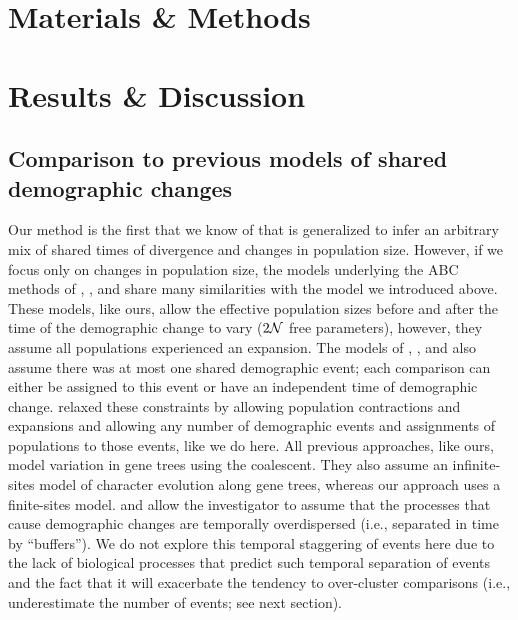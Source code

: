 

\section{Materials \& Methods}




\section{Results \& Discussion}



\subsection{Comparison to previous models of shared demographic changes}

Our method is the first that we know of that is generalized to infer an
arbitrary mix of shared times of divergence and changes in population size.
However, if we focus only on changes in population size, the models underlying
the ABC methods of
\citet{Chan2014}, \citet{Xue2015}, and \citet{Gehara2017}
share many similarities with the model we introduced above.
These models, like ours, allow the effective population sizes before and after
the time of the demographic change to vary ($2\mathcal{N}$ free parameters),
however, they assume all populations experienced an expansion.
The models of \citet{Chan2014}, \citet{Xue2015}, and \citet{Gehara2017}
also assume there was at most one shared demographic event;
each comparison can either be assigned to this event or have an independent
time of demographic change.
\citet{Xue2017} relaxed these constraints by allowing population contractions
and expansions and allowing any number of demographic events and assignments of
populations to those events, like we do here.
All previous approaches, like ours, model variation in gene trees using the
coalescent.
They also assume an infinite-sites model of character evolution along gene
trees, whereas our approach uses a finite-sites model.
\citet{Gehara2017} and \citet{Xue2017}
allow the investigator to assume that the processes that cause demographic
changes are temporally overdispersed (i.e., separated in time by ``buffers'').
We do not explore this temporal staggering of events here due to the lack of
biological processes that predict such temporal separation of events and the
fact that it will exacerbate the tendency to over-cluster comparisons
(i.e., underestimate the number of events; see next section).

